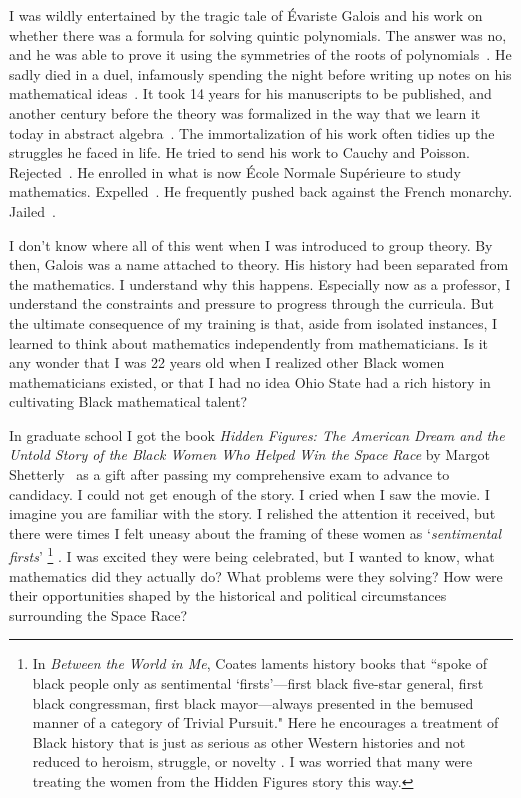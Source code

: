\documentclass[pdflatex,sn-mathphys-num]{sn-jnl}%
\begin{document}
I was wildly entertained by the tragic tale of Évariste Galois and his work on whether there was a formula for solving quintic polynomials. The answer was no, and he was able to prove it using the symmetries of the roots of polynomials~\cite{stewart2003galois}. He sadly died in a duel, infamously spending the night before writing up notes on his mathematical ideas~\cite{rothman1982short}. It took 14 years for his manuscripts to be published, and another century before the theory was formalized in the way that we learn it today in abstract algebra~\cite{Galois1846, artin1998galois}. The immortalization of his work often tidies up the struggles he faced in life. He tried to send his work to Cauchy and Poisson. Rejected~\cite{rothman1982short}. He enrolled in what is now École Normale Supérieure to study mathematics. Expelled~\cite{toti1998evariste}. He frequently pushed back against the French monarchy. Jailed~\cite{toti1998evariste}. 
 
I don't know where all of this went when I was introduced to group theory. By then, Galois was a name attached to theory. His history had been separated from the mathematics. I understand why this happens. Especially now as a professor, I understand the constraints and pressure to progress through the curricula. But the ultimate consequence of my training is that, aside from isolated instances, I learned to think about mathematics independently from mathematicians. Is it any wonder that I was 22 years old when I realized other Black women mathematicians existed, or that I had no idea Ohio State had a rich history in cultivating Black mathematical talent?  

In graduate school I got the book \emph{Hidden Figures: The American Dream and the Untold Story of the Black Women Who Helped Win the Space Race} by Margot Shetterly~\cite{shetterly2016hidden} as a gift after passing my comprehensive exam to advance to candidacy. I could not get enough of the story. I cried when I saw the movie. I imagine you are familiar with the story. I relished the attention it received, but there were times I felt uneasy about the framing of these women as `\emph{sentimental firsts}' \footnote{In \emph{Between the World in Me}, Coates laments history books that ``spoke of black people only as sentimental ‘firsts’—first black five-star general, first black congressman, first black mayor—always presented in the bemused manner of a category of Trivial Pursuit." Here he encourages a treatment of Black history that is just as serious as other Western histories and not reduced to heroism, struggle, or novelty \cite{coates2015between}. I was worried that many were treating the women from the Hidden Figures story this way.} \cite{coates2015between}. I was excited they were being celebrated, but I wanted to know, what mathematics did they actually do? What problems were they solving? How were their opportunities shaped by the historical and political circumstances surrounding the Space Race? 
\end{document}
